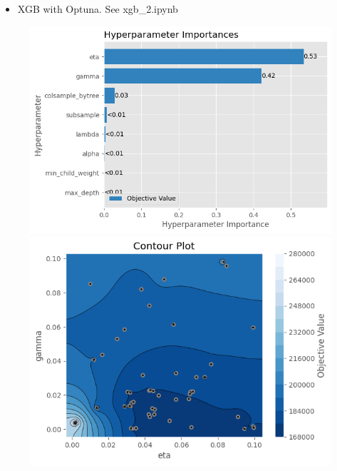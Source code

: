 \documentclass{beamer}
\begin{document}
\begin{frame}
\begin{itemize}
    \item {\footnotesize XGB with Optuna. See xgb\_2.ipynb}
\end{itemize}
\begin{figure}
        \begin{minipage}[t]{0.48\textwidth}
            \center
            \includegraphics[width=\linewidth]{figure/xgb_2_hyperImportance.png}
        \end{minipage}
        \begin{minipage}[t]{0.48\textwidth}
            \center
            \includegraphics[width=\linewidth]{figure/xgb_2_gamma_eta.png}
        \end{minipage}

\end{figure}
\end{frame}
\end{document}
